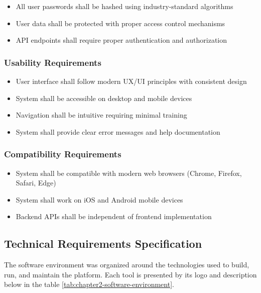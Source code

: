 \begin{itemize}
    \item All user passwords shall be hashed using industry-standard algorithms
    \item User data shall be protected with proper access control mechanisms
    \item API endpoints shall require proper authentication and authorization
\end{itemize}
\subsubsection{Usability Requirements}

\begin{itemize}
    \item User interface shall follow modern UX/UI principles with consistent design
    \item System shall be accessible on desktop and mobile devices
    \item Navigation shall be intuitive requiring minimal training
    \item System shall provide clear error messages and help documentation
\end{itemize}

\subsubsection{Compatibility Requirements}

\begin{itemize}
    \item System shall be compatible with modern web browsers (Chrome, Firefox, Safari, Edge)
    \item System shall work on iOS and Android mobile devices
    \item Backend APIs shall be independent of frontend implementation
\end{itemize}
\subsection{Technical Requirements Specification}

The software environment was organized around the technologies used to build, run, and maintain the platform.
Each tool is presented by its logo and description below in the table \ref{tab:chapter2-software-environment}.

